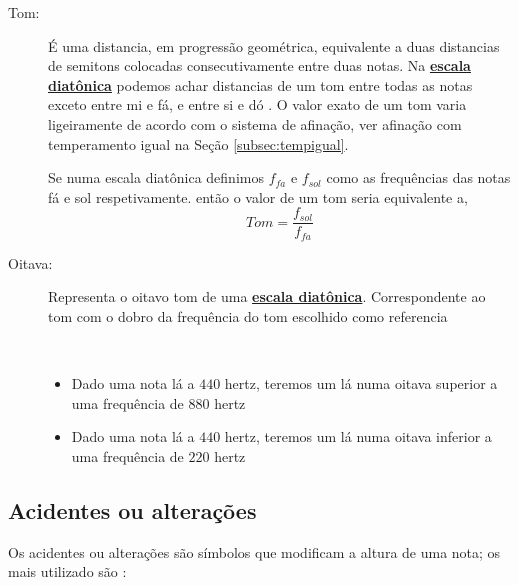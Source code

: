 \begin{description}
\item [Tom:] \label{sec:pos:TomDist}
É uma distancia, em progressão geométrica, equivalente a duas distancias de semitons colocadas consecutivamente entre duas notas.
Na \hyperref[sec:pos:Diatonica]{\textbf{escala diatônica}} podemos achar distancias de um tom entre todas as notas exceto entre mi e fá, e entre si e dó \cite[pp. 30]{cardoso1973curso}\cite[pp. 762]{apel1969harvard}.
O valor exato de um tom varia ligeiramente de acordo com o sistema de afinação, ver afinação com temperamento igual na Seção \ref{subsec:tempigual}. 
\begin{example}
Se numa escala diatônica definimos $f_{fa}$ e $f_{sol}$ como as frequências das notas fá e sol respetivamente.
então o valor de um tom seria equivalente a,
\begin{equation*}
Tom=\frac{f_{sol}}{f_{fa}}
\end{equation*}
\end{example}

\item [Oitava:] \label{sec:pos:Oitava}
Representa o oitavo tom de uma \hyperref[sec:pos:Diatonica]{\textbf{escala diatônica}}. 
Correspondente  ao tom com o dobro da frequência do tom escolhido como referencia \cite[pp. 589]{apel1969harvard}
\begin{example}~
\begin{itemize}
\item Dado uma nota lá a $440$ hertz, teremos um lá numa oitava superior a uma frequência de $880$ hertz  
\item Dado uma nota lá a $440$ hertz, teremos um lá numa oitava inferior a uma frequência de $220$ hertz  
\end{itemize}
\end{example}

\end{description}

\subsection{Acidentes ou alterações}
\label{subsec:acidentes}


Os acidentes ou alterações são símbolos que modificam a altura de uma nota; 
os mais utilizado são \cite[pp. ]{alves2004teoria}:\\

